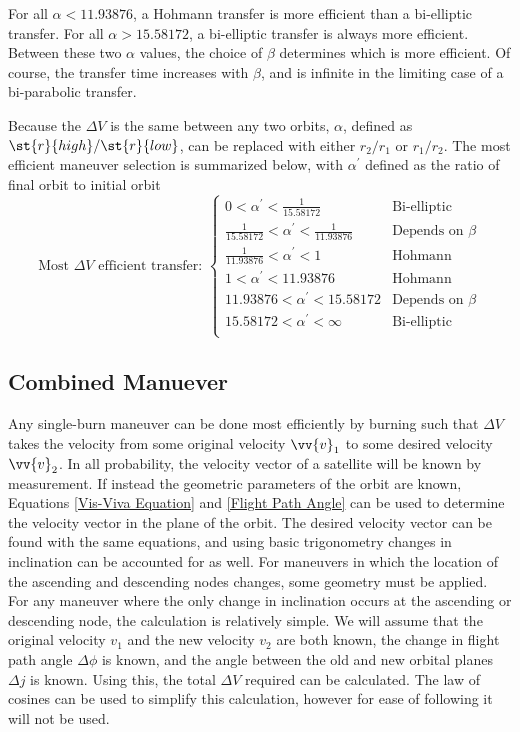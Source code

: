 \documentclass[../basicOrbitalDynamics.tex]{subfiles}
\begin{document}
For all $\alpha<11.93876$, a Hohmann transfer is more efficient than a bi-elliptic transfer. For all $\alpha>15.58172$, a bi-elliptic transfer is always more efficient. Between these two $\alpha$ values, the choice of $\beta$ determines which is more efficient. Of course, the transfer time increases with $\beta$, and is infinite in the limiting case of a bi-parabolic transfer.

Because the $\Delta V$ is the same between any two orbits, $\alpha$, defined as $\st{r}{high}/\st{r}{low}$, can be replaced with either $r_2/r_1$ or $r_1/r_2$. The most efficient maneuver selection is summarized below, with $\alpha^\prime$ defined as the ratio of final orbit to initial orbit
\begin{equation*}
    \text{Most }\Delta V\text{ efficient transfer: }
    \begin{cases}
        0<\alpha^\prime<\frac{1}{15.58172}                  & \text{Bi-elliptic} \\
        \frac{1}{15.58172}<\alpha^\prime<\frac{1}{11.93876} & \text{Depends on }\beta \\
        \frac{1}{11.93876}<\alpha^\prime<1                  & \text{Hohmann} \\
        1<\alpha^\prime<11.93876                            & \text{Hohmann} \\
        11.93876<\alpha^\prime<15.58172                     & \text{Depends on }\beta \\
        15.58172<\alpha^\prime<\infty                       & \text{Bi-elliptic} \\
    \end{cases}
\end{equation*}

\bigskip\bigskip
\subsection{Combined Manuever}

Any single-burn maneuver can be done most efficiently by burning such that $\Delta V$ takes the velocity from some original velocity $\vv{v}_1$ to some desired velocity $\vv{v}_2$. In all probability, the velocity vector of a satellite will be known by measurement. If instead the geometric parameters of the orbit are known, Equations \eqref{Vis-Viva Equation} and \eqref{Flight Path Angle} can be used to determine the velocity vector in the plane of the orbit. The desired velocity vector can be found with the same equations, and using basic trigonometry changes in inclination can be accounted for as well. For maneuvers in which the location of the ascending and descending nodes changes, some geometry must be applied. For any maneuver where the only change in inclination occurs at the ascending or descending node, the calculation is relatively simple. We will assume that the original velocity $v_1$ and the new velocity $v_2$ are both known, the change in flight path angle $\Delta \phi$ is known, and the angle between the old and new orbital planes $\Delta j$ is known. Using this, the total $\Delta V$ required can be calculated. The law of cosines can be used to simplify this calculation, however for ease of following it will not be used.
\end{document}
